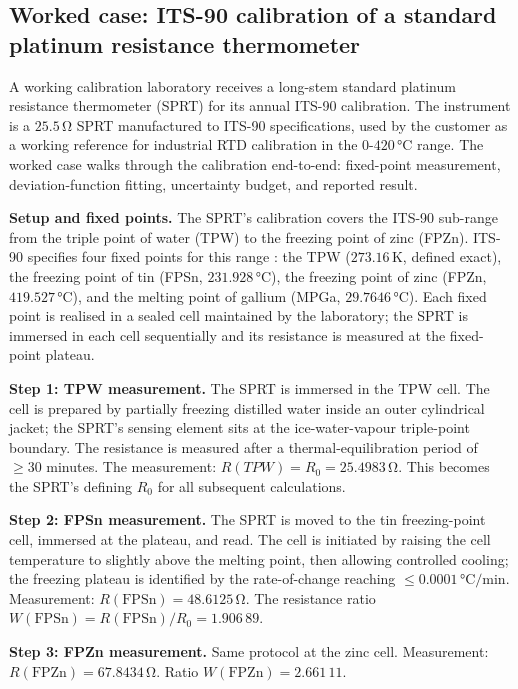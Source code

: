\subsection{Worked case: ITS-90 calibration of a standard
platinum resistance thermometer}

A working calibration laboratory receives a long-stem standard
platinum resistance thermometer (SPRT) for its annual ITS-90
calibration. The instrument is a $25.5\,\si{\ohm}$ SPRT
manufactured to ITS-90 specifications, used by the customer as a
working reference for industrial RTD calibration in the
$0$-$420 \,\si{\degreeCelsius}$ range. The worked case walks
through the calibration end-to-end: fixed-point measurement,
deviation-function fitting, uncertainty budget, and reported
result.

\textbf{Setup and fixed points.} The SPRT's calibration covers the
ITS-90 sub-range from the triple point of water (TPW) to the
freezing point of zinc (FPZn). ITS-90 specifies four fixed points
for this range \cite{web:bipm-cct-its90}: the TPW
($273.16 \,\si{\kelvin}$, defined exact), the freezing point of
tin (FPSn, $231.928 \,\si{\degreeCelsius}$), the freezing point of
zinc (FPZn, $419.527 \,\si{\degreeCelsius}$), and the melting point
of gallium (MPGa, $29.7646 \,\si{\degreeCelsius}$). Each fixed
point is realised in a sealed cell maintained by the laboratory;
the SPRT is immersed in each cell sequentially and its resistance
is measured at the fixed-point plateau.

\textbf{Step 1: TPW measurement.} The SPRT is immersed in the TPW
cell. The cell is prepared by partially freezing distilled water
inside an outer cylindrical jacket; the SPRT's sensing element sits
at the ice-water-vapour triple-point boundary. The resistance is
measured after a thermal-equilibration period of $\geq 30$
minutes. The measurement: $R(TPW) = R_{0} = 25.4983 \,\si{\ohm}$.
This becomes the SPRT's defining $R_{0}$ for all subsequent
calculations.

\textbf{Step 2: FPSn measurement.} The SPRT is moved to the tin
freezing-point cell, immersed at the plateau, and read. The cell
is initiated by raising the cell temperature to slightly above the
melting point, then allowing controlled cooling; the freezing
plateau is identified by the rate-of-change reaching $\leq
0.0001 \,\si{\degreeCelsius}/\text{min}$. Measurement: $R(\text{
FPSn}) = 48.6125 \,\si{\ohm}$. The resistance ratio $W(\text{FPSn})
= R(\text{FPSn})/R_{0} = 1.906\,89$.

\textbf{Step 3: FPZn measurement.} Same protocol at the zinc cell.
Measurement: $R(\text{FPZn}) = 67.8434 \,\si{\ohm}$. Ratio
$W(\text{FPZn}) = 2.661\,11$.

